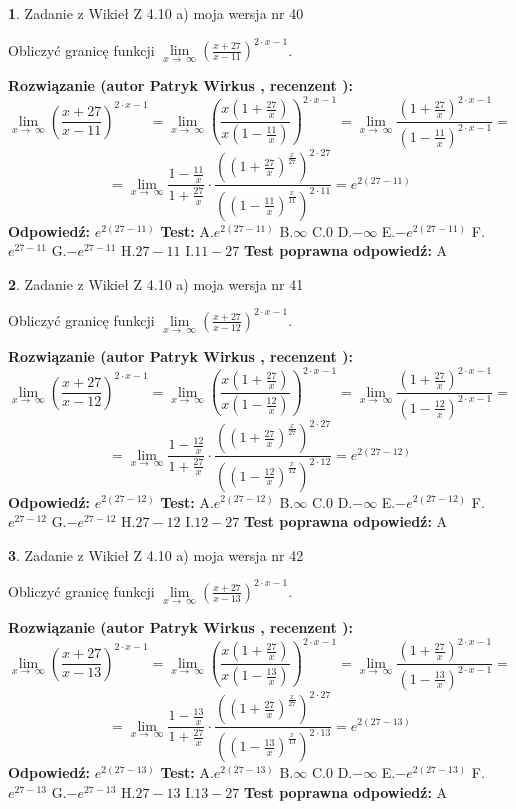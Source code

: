 \documentclass[12pt, a4paper]{article}
\theoremstyle{definition} %
\newtheorem{zad}{}
\newcommand{\zadStart}[1]{\begin{zad}#1\newline}
\newcommand{\zadStop}{\end{zad}}
\newcommand{\rozwStart}[2]{\noindent \textbf{Rozwiązanie (autor #1 , recenzent #2): }\newline}
\newcommand{\rozwStop}{\newline}
\newcommand{\odpStart}{\noindent \textbf{Odpowiedź:}\newline}
\newcommand{\odpStop}{\newline}
\newcommand{\testStart}{\noindent \textbf{Test:}\newline}
\newcommand{\testStop}{\newline}
\newcommand{\kluczStart}{\noindent \textbf{Test poprawna odpowiedź:}\newline}
\newcommand{\kluczStop}{\newline}
\begin{document}
\zadStart{Zadanie z Wikieł Z 4.10 a) moja wersja nr 40}


Obliczyć granicę funkcji  $\lim\limits_{x\to\ \infty}(\frac{x+27}{x-11})^{2\cdot x-1}$.
\zadStop
\rozwStart{Patryk Wirkus}{}
$$\lim\limits_{x\to\ \infty}(\frac{x+27}{x-11})^{2\cdot x-1} = \lim\limits_{x\to\ \infty}(\frac{x(1+\frac{27}{x})}{x(1-\frac{11}{x})})^{2\cdot x-1}=\lim\limits_{x\to\ \infty}\frac{(1+\frac{27}{x})^{2\cdot x-1}}{(1-\frac{11}{x})^{2\cdot x-1}}=$$
$$=\lim\limits_{x\to\ \infty}\frac{1-\frac{11}{x}}{1+\frac{27}{x}}\cdot\frac{((1+\frac{27}{x})^{\frac{x}{27}})^{2\cdot27}}{((1-\frac{11}{x})^{\frac{x}{11}})^{2\cdot11}}=e^{2(27-11)}$$
\rozwStop
\odpStart
$e^{2(27-11)}$
\odpStop
\testStart
A.$e^{2(27-11)}$ B.$\infty$ C.$0$ D.$-\infty$ E.$-e^{2(27-11)}$
F.$e^{27-11}$ G.$-e^{27-11}$
H.$27-11$
I.$11-27$
\testStop
\kluczStart
A
\kluczStop



\zadStart{Zadanie z Wikieł Z 4.10 a) moja wersja nr 41}


Obliczyć granicę funkcji  $\lim\limits_{x\to\ \infty}(\frac{x+27}{x-12})^{2\cdot x-1}$.
\zadStop
\rozwStart{Patryk Wirkus}{}
$$\lim\limits_{x\to\ \infty}(\frac{x+27}{x-12})^{2\cdot x-1} = \lim\limits_{x\to\ \infty}(\frac{x(1+\frac{27}{x})}{x(1-\frac{12}{x})})^{2\cdot x-1}=\lim\limits_{x\to\ \infty}\frac{(1+\frac{27}{x})^{2\cdot x-1}}{(1-\frac{12}{x})^{2\cdot x-1}}=$$
$$=\lim\limits_{x\to\ \infty}\frac{1-\frac{12}{x}}{1+\frac{27}{x}}\cdot\frac{((1+\frac{27}{x})^{\frac{x}{27}})^{2\cdot27}}{((1-\frac{12}{x})^{\frac{x}{12}})^{2\cdot12}}=e^{2(27-12)}$$
\rozwStop
\odpStart
$e^{2(27-12)}$
\odpStop
\testStart
A.$e^{2(27-12)}$ B.$\infty$ C.$0$ D.$-\infty$ E.$-e^{2(27-12)}$
F.$e^{27-12}$ G.$-e^{27-12}$
H.$27-12$
I.$12-27$
\testStop
\kluczStart
A
\kluczStop



\zadStart{Zadanie z Wikieł Z 4.10 a) moja wersja nr 42}


Obliczyć granicę funkcji  $\lim\limits_{x\to\ \infty}(\frac{x+27}{x-13})^{2\cdot x-1}$.
\zadStop
\rozwStart{Patryk Wirkus}{}
$$\lim\limits_{x\to\ \infty}(\frac{x+27}{x-13})^{2\cdot x-1} = \lim\limits_{x\to\ \infty}(\frac{x(1+\frac{27}{x})}{x(1-\frac{13}{x})})^{2\cdot x-1}=\lim\limits_{x\to\ \infty}\frac{(1+\frac{27}{x})^{2\cdot x-1}}{(1-\frac{13}{x})^{2\cdot x-1}}=$$
$$=\lim\limits_{x\to\ \infty}\frac{1-\frac{13}{x}}{1+\frac{27}{x}}\cdot\frac{((1+\frac{27}{x})^{\frac{x}{27}})^{2\cdot27}}{((1-\frac{13}{x})^{\frac{x}{13}})^{2\cdot13}}=e^{2(27-13)}$$
\rozwStop
\odpStart
$e^{2(27-13)}$
\odpStop
\testStart
A.$e^{2(27-13)}$ B.$\infty$ C.$0$ D.$-\infty$ E.$-e^{2(27-13)}$
F.$e^{27-13}$ G.$-e^{27-13}$
H.$27-13$
I.$13-27$
\testStop
\kluczStart
A
\kluczStop
\end{document}
